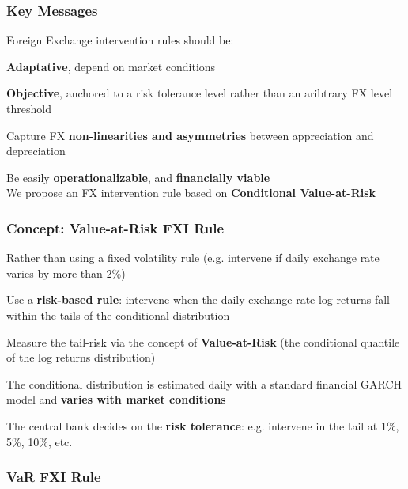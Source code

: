 \documentclass{beamer}
\newenvironment{largeitemize}{\itemize\addtolength{\itemsep}{10pt}}{\enditemize}
\begin{document}
\begin{frame}
  \frametitle{Key Messages}
  Foreign Exchange intervention rules should be:\\
  \medskip  
  \begin{largeitemize}
  \item \textbf{Adaptative}, depend on market conditions
  \item \textbf{Objective}, anchored to a risk tolerance level
    rather than an aribtrary FX level threshold
  \item Capture FX \textbf{non-linearities and asymmetries} between appreciation and
    depreciation
  \item Be easily \textbf{operationalizable}, and \textbf{financially viable}\\
  \end{largeitemize}
\medskip  
We propose an FX intervention rule based on \textbf{Conditional Value-at-Risk}  
\end{frame}

\begin{frame}
  \frametitle{Concept: Value-at-Risk FXI Rule}
  \begin{largeitemize}
    \item Rather than using a fixed volatility rule (e.g. intervene if daily
      exchange rate varies by more than 2\%)
    \item Use a \textbf{risk-based rule}: intervene when the daily exchange
      rate log-returns fall within the
      tails of the conditional distribution
    \item Measure the tail-risk via the concept of \textbf{Value-at-Risk} (the
      conditional quantile of the log returns distribution) 
    \item The conditional distribution is estimated daily with a standard
      financial GARCH model and \textbf{varies with market conditions}
    \item The central bank decides on the \textbf{risk tolerance}:
      e.g. intervene in the tail at 1\%, 5\%, 10\%, etc.
  \end{largeitemize}
\end{frame}

\begin{frame}
  \frametitle{VaR FXI Rule}
\end{frame}
\end{document}
